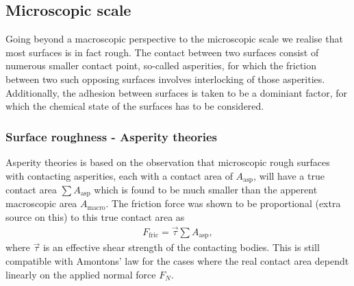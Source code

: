 \subsection{Microscopic scale}

Going beyond a macroscopic perspective to the microscopic scale we realise that most surfaces is in fact rough. The contact between two surfaces consist of numerous smaller contact point, so-called asperities, for which the friction between two such opposing surfaces involves interlocking of those asperities. Additionally, the adhesion between surfaces is taken to be a dominiant factor, for which the chemical state of the surfaces has to be considered.




\subsubsection{Surface roughness - Asperity theories}

Asperity theories is based on the observation that microscopic rough surfaces
with contacting asperities, each with a contact area of $A_{\text{asp}}$, will
have a true contact area $\sum A_{\text{asp}}$ which is found to be much smaller
than the apperent macroscopic area $A_{\text{macro}}$. The friction force was
shown to be proportional (extra source on this) to this true contact area as 
\begin{align*}
  F_\text{fric} = \vec{\tau} \sum A_{\text{asp}},
\end{align*}
where $\vec{\tau}$ is an effective shear strength of the contacting bodies. This
is still compatible with Amontons’ law for the cases where the real contact area
dependt linearly on the applied normal force $F_N$.


